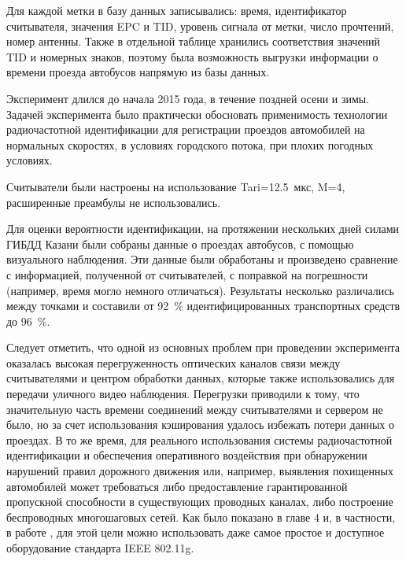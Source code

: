 Для каждой метки в базу данных записывались: время, идентификатор считывателя, значения EPC и TID, уровень сигнала от метки, число прочтений, номер антенны. Также в отдельной таблице хранились соответствия значений TID и номерных знаков, поэтому была возможность выгрузки информации о времени проезда автобусов напрямую из базы данных.


Эксперимент длился до начала 2015 года, в течение поздней осени и зимы. Задачей эксперимента было практически обосновать применимость технологии радиочастотной идентификации для регистрации проездов автомобилей на нормальных скоростях, в условиях городского потока, при плохих погодных условиях.


Считыватели были настроены на использование Tari=12.5~мкс, M=4, расширенные преамбулы не использовались.

Для оценки вероятности идентификации, на протяжении нескольких дней силами ГИБДД Казани были собраны данные о проездах автобусов, с помощью визуального наблюдения. Эти данные были обработаны и произведено сравнение с информацией, полученной от считывателей, с поправкой на погрешности (например, время могло немного отличаться). Результаты несколько различались между точками и составили от 92~\% идентифицированных транспортных средств до 96~\%.

Следует отметить, что одной из основных проблем при проведении эксперимента оказалась высокая перегруженность оптических каналов связи между считывателями и центром обработки данных, которые также использовались для передачи уличного видео наблюдения. Перегрузки приводили к тому, что значительную часть времени соединений между считывателями и сервером не было, но за счет использования кэширования удалось избежать потери данных о проездах. В то же время, для реального использования системы радиочастотной идентификации и обеспечения оперативного воздействия при обнаружении нарушений правил дорожного движения или, например, выявления похищенных автомобилей может требоваться либо предоставление гарантированной пропускной способности в существующих проводных каналах, либо построение беспроводных многошаговых сетей. Как было показано в главе 4 и, в частности, в работе \cite{WINET_DCCN2018}, для этой цели можно использовать даже самое простое и доступное оборудование стандарта IEEE 802.11g.





\clearpage
